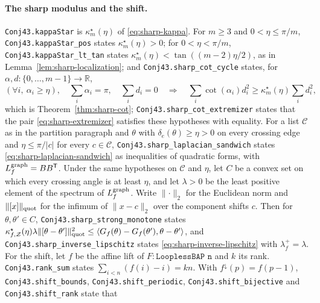 \documentclass[11pt]{article}
\theoremstyle{definition}
\newcommand{\R}{\mathbb{R}}
\begin{document}
\paragraph{The sharp modulus and the shift.}
\texttt{Conj43.\allowbreak kappaStar} is $\kappa_m^\star(\eta)$ of \eqref{eq:sharp-kappa}. For $m\ge3$ and
$0<\eta\le\pi/m$, \texttt{Conj43.\allowbreak kappaStar\_\allowbreak pos} states $\kappa_m^\star(\eta)>0$; for
$0<\eta<\pi/m$, \texttt{Conj43.\allowbreak kappaStar\_\allowbreak lt\_\allowbreak tan} states
$\kappa_m^\star(\eta)<\tan((m-2)\eta/2)$, as in Lemma~\ref{lem:sharp-localization}; and
\texttt{Conj43.\allowbreak sharp\_\allowbreak cot\_\allowbreak cycle} states, for $\alpha,d:\{0,\ldots,m-1\}\to\R$,
\[
 \left(\forall i,\ \alpha_i\ge\eta\right),\quad
 \sum_i\alpha_i=\pi,\quad\sum_i d_i=0
 \quad\Longrightarrow\quad
 \sum_i\cot(\alpha_i)d_i^2\ge\kappa_m^\star(\eta)\sum_i d_i^2,
\]
which is Theorem~\ref{thm:sharp-cot}; \texttt{Conj43.\allowbreak sharp\_\allowbreak cot\_\allowbreak extremizer} states that the
pair \eqref{eq:sharp-extremizer} satisfies these hypotheses with equality. For a list $\mathcal C$ as in
the partition paragraph and $\theta$ with $\delta_e(\theta)\ge\eta>0$ on every crossing edge and
$\eta\le\pi/|c|$ for every $c\in\mathcal C$, \texttt{Conj43.\allowbreak sharp\_\allowbreak laplacian\_\allowbreak sandwich} states
\eqref{eq:sharp-laplacian-sandwich} as inequalities of quadratic forms, with $L_f^{\rm graph}=BB^{\mathsf T}$.
Under the same hypotheses on $\mathcal C$ and $\eta$, let $C$ be a convex set on which every crossing angle is at
least $\eta$, and let $\lambda>0$ be the least positive element of the spectrum of $L_f^{\rm graph}$. Write
$\lVert\cdot\rVert_2$ for the Euclidean norm and $\lVert[x]\rVert_{\rm quot}$ for the infimum of $\lVert x-c\rVert_2$
over the component shifts $c$. Then for $\theta,\theta'\in C$,
\texttt{Conj43.\allowbreak sharp\_\allowbreak strong\_\allowbreak monotone} states
$\kappa_{f,\mathcal Z}^\star(\eta)\lambda\lVert[\theta-\theta']\rVert_{\rm quot}^2\le
\langle G_f(\theta)-G_f(\theta'),\theta-\theta'\rangle$, and
\texttt{Conj43.\allowbreak sharp\_\allowbreak inverse\_\allowbreak lipschitz} states
\eqref{eq:sharp-inverse-lipschitz} with $\lambda_f^+=\lambda$.
For the shift, let $f$ be the affine lift of $F:\texttt{LooplessBAP n}$ and $k$ its rank.
\texttt{Conj43.\allowbreak rank\_\allowbreak sum} states $\sum_{i<n}(f(i)-i)=kn$. With $f^\downarrow(p)=f(p-1)$,
\texttt{Conj43.\allowbreak shift\_\allowbreak bounds}, \texttt{Conj43.\allowbreak shift\_\allowbreak periodic},
\texttt{Conj43.\allowbreak shift\_\allowbreak bijective} and \texttt{Conj43.\allowbreak shift\_\allowbreak rank} state that
\end{document}
